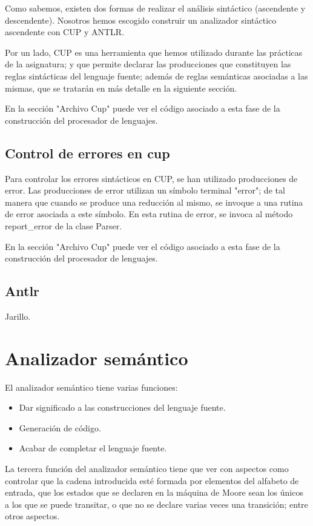 \documentclass[12pt,a4paper]{article}
\begin{document}
Como sabemos, existen dos formas de realizar el análisis sintáctico (ascendente y descendente). Nosotros hemos escogido construir un analizador sintáctico ascendente con CUP y ANTLR. 

Por un lado, CUP es una herramienta que hemos utilizado durante las prácticas de la asignatura; y que permite declarar las producciones que constituyen las reglas sintácticas del lenguaje fuente; además de reglas semánticas asociadas a las mismas, que se tratarán en más detalle en la siguiente sección. 

En la sección "Archivo Cup" puede ver el código asociado a esta fase de la construcción del procesador de lenguajes.

\subsection{Control de errores en cup}

Para controlar los errores sintácticos en CUP, se han utilizado producciones de error. Las producciones de error utilizan un símbolo terminal "error"; de tal manera que cuando se produce una reducción al mismo, se invoque a una rutina de error asociada a este símbolo. En esta rutina de error, se invoca al método report\_error de la clase Parser.

En la sección "Archivo Cup" puede ver el código asociado a esta fase de la construcción del procesador de lenguajes.

\subsection{Antlr}

Jarillo.

\section{Analizador semántico}

El analizador semántico tiene varias funciones:

\begin{itemize}
	\item Dar significado a las construcciones del lenguaje fuente. 
	\item Generación de código.
	\item Acabar de completar el lenguaje fuente.
\end{itemize}
 
La tercera función del analizador semántico tiene que ver con aspectos como controlar que la cadena introducida esté formada por elementos del alfabeto de entrada, que los estados que se declaren en la máquina de Moore sean los únicos a los que se puede transitar, o que no se declare varias veces una transición; entre otros aspectos.
\end{document}
